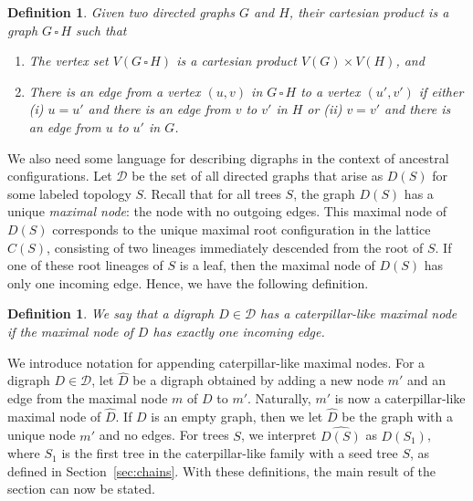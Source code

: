 \documentclass[10pt]{article}
\newcommand*{\cp}[2]{#1 \,\square\, #2}
\newtheorem{definition}[theorem]{Definition}%
\begin{document}
\begin{definition}\label{def:cart_product}
	Given two directed graphs $G$ and $H$, their \emph{cartesian product} is a graph $\cp G H$ such that
	\begin{enumerate}
		\item The vertex set $V(\cp G H)$ is a cartesian product $V(G) \times V(H)$, and
		\item There is an edge from a vertex $(u,v)$ in $\cp G H$ to a vertex $(u',v')$ if either (i) $u=u'$ and there is an edge from $v$ to $v'$ in $H$ \emph{or} (ii) $v=v'$ and there is an edge from $u$ to $u'$ in $G$.
	\end{enumerate} 
\end{definition}

We also need some language for describing digraphs in the context  of ancestral configurations. Let $\mathcal{D}$ be the set of all directed graphs that arise as $D(S)$ for some labeled topology $S$. Recall that for all trees $S$, the graph $D(S)$ has a unique \emph{maximal node}: the node with no outgoing edges. This maximal node of $D(S)$ corresponds to the unique maximal root configuration in the lattice $C(S)$, consisting of two lineages immediately descended from the root of $S$. If one of these root lineages of $S$ is a leaf, then the maximal node of $D(S)$ has only one incoming edge. Hence, we have the following definition.
\begin{definition}
	We say that a digraph $D \in \mathcal D$ has a \emph{caterpillar-like maximal node} if the maximal node of $D$ has exactly one incoming edge.
\end{definition}

We introduce notation for appending caterpillar-like maximal nodes. For a digraph $D\in \mathcal D$, let $\widehat D$ be a digraph obtained by adding a new node $m'$ and an edge from the maximal node $m$ of $D$ to $m'$. Naturally, $m'$ is now a caterpillar-like maximal node of $\widehat D$. If $D$ is an empty graph, then we let $\widehat{D}$ be the graph with a unique node $m'$ and no edges.
For trees $S$, we interpret $\widehat{D(S)}$ as $D(S_1)$, where $S_1$ is the first tree in the caterpillar-like family with a seed tree $S$, as defined in Section~\ref{sec:chains}. With these definitions, the main result of the section can now be stated.
\end{document}
